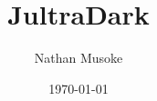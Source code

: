 \documentclass[twoside]{article}
\begin{document}
\title{JultraDark}
\author{%
    Nathan Musoke
}
\date{\today}

\maketitle










\end{document}
